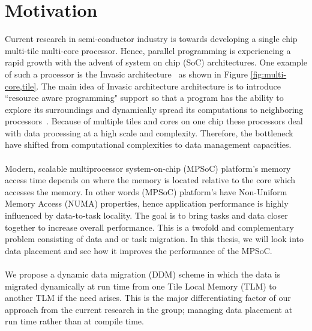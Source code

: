 \documentclass{listhesis}
\begin{document}
\section{Motivation}
Current research in semi-conductor industry is towards developing a single chip multi-tile multi-core processor. Hence, parallel programming is experiencing a rapid growth with the advent of system on chip (SoC) architectures. One example of such a processor is the Invasic architecture~\cite{invasive} as shown in Figure \ref{fig:multi-core,tile}. The main idea of Invasic architecture architecture is to introduce ``resource aware programming" support so that a program has the ability to explore its surroundings and dynamically spread its computations to neighboring processors~\cite{invasive}. Because of multiple tiles and cores on one chip these processors deal with data processing at a high scale and complexity. Therefore, the bottleneck have shifted from computational complexities to data management capacities.\\
\\
Modern, scalable multiprocessor system-on-chip (MPSoC) platform's memory access time depends on where the memory is located relative to the core which accesses the memory. In other words (MPSoC) platform's have Non-Uniform Memory Access (NUMA) properties, hence application performance is highly influenced by data-to-task locality. The goal is to bring tasks and data closer together to increase overall performance. This is a twofold and complementary problem consisting of data and or task migration. In this thesis, we will look into data placement and see how it improves the performance of the MPSoC.\\
\\
We propose a dynamic data migration (DDM) scheme in which the data is migrated dynamically at run time from one Tile Local Memory (TLM) to another TLM if the need arises. This is the major differentiating factor of our approach from the current research in the group; managing data placement at run time rather than at compile time.
\end{document}
